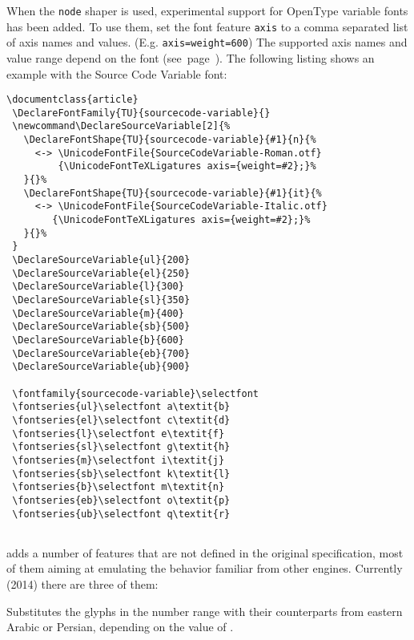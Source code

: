   \endaltitem

   When\label{variablefonts}
   the \texttt{node} shaper is used,
   experimental support for OpenType variable
   fonts has been added. To use them, set the font feature \texttt{axis} to
   a comma separated list of axis names and values. (E.g.  \texttt{axis={weight=600}})
   The supported axis names and value range depend on the font (see~page~\pageref{variablefonts}).
   The following listing shows an example with the Source Code Variable font:

  \begin{lstlisting}[columns=fullflexible]
\documentclass{article}
 \DeclareFontFamily{TU}{sourcecode-variable}{}
 \newcommand\DeclareSourceVariable[2]{%
   \DeclareFontShape{TU}{sourcecode-variable}{#1}{n}{%
     <-> \UnicodeFontFile{SourceCodeVariable-Roman.otf}
         {\UnicodeFontTeXLigatures axis={weight=#2};}%
   }{}%
   \DeclareFontShape{TU}{sourcecode-variable}{#1}{it}{%
     <-> \UnicodeFontFile{SourceCodeVariable-Italic.otf}
        {\UnicodeFontTeXLigatures axis={weight=#2};}%
   }{}%
 }
 \DeclareSourceVariable{ul}{200}
 \DeclareSourceVariable{el}{250}
 \DeclareSourceVariable{l}{300}
 \DeclareSourceVariable{sl}{350}
 \DeclareSourceVariable{m}{400}
 \DeclareSourceVariable{sb}{500}
 \DeclareSourceVariable{b}{600}
 \DeclareSourceVariable{eb}{700}
 \DeclareSourceVariable{ub}{900}
 
 \fontfamily{sourcecode-variable}\selectfont
 \fontseries{ul}\selectfont a\textit{b}
 \fontseries{el}\selectfont c\textit{d}
 \fontseries{l}\selectfont e\textit{f}
 \fontseries{sl}\selectfont g\textit{h}
 \fontseries{m}\selectfont i\textit{j}
 \fontseries{sb}\selectfont k\textit{l}
 \fontseries{b}\selectfont m\textit{n}
 \fontseries{eb}\selectfont o\textit{p}
 \fontseries{ub}\selectfont q\textit{r}
 
\end{lstlisting}

  \enddescriptions

\endsubsection

 adds a number of features that are not defined
in the original \OpenType specification, most of them
aiming at emulating the behavior familiar from other \TEX engines.
%
Currently (2014) there are three of them:

\begindescriptions

          Substitutes the glyphs in the  number range
          with their counterparts from eastern Arabic or Persian,
          depending on the value of .
  \endaltitem

